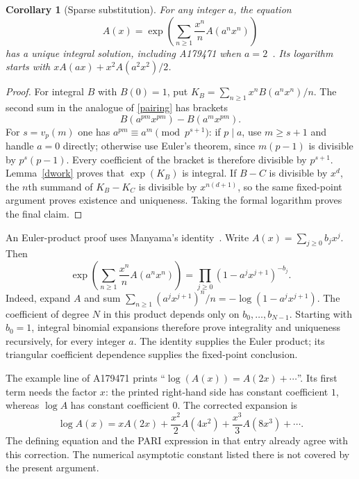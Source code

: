 \documentclass[11pt]{article}
\newtheorem{corollary}[theorem]{Corollary}
\begin{document}
\begin{corollary}[Sparse substitution]\label{sparse}
For any integer $a$, the equation
\begin{equation}\label{sparse-equation}
 A(x)=\exp\left(\sum_{n\geq1}\frac{x^n}{n}A(a^nx^n)\right)
\end{equation}
has a unique integral solution, including A179471 when $a=2$~\cite{oeis179471}.
Its logarithm starts with $xA(ax)+x^2A(a^2x^2)/2$.
\end{corollary}
\begin{proof}
For integral $B$ with $B(0)=1$, put $K_B=\sum_{n\geq1}x^nB(a^nx^n)/n$.
The second sum in the analogue of \eqref{pairing} has brackets
\[
 B(a^{pm}x^{pm})-B(a^m x^{pm}).
\]
For $s=v_p(m)$ one has $a^{pm}\equiv a^m\pmod{p^{s+1}}$:
if $p\mid a$, use $m\geq s+1$ and handle $a=0$ directly;
otherwise use Euler's theorem, since $m(p-1)$ is divisible by $p^s(p-1)$.
Every coefficient of the bracket is therefore divisible by $p^{s+1}$.
Lemma~\ref{dwork} proves that $\exp(K_B)$ is integral.
If $B-C$ is divisible by $x^d$, the $n$th summand of $K_B-K_C$
is divisible by $x^{n(d+1)}$, so the same fixed-point argument proves
existence and uniqueness. Taking the formal logarithm proves the final claim.
\end{proof}

An Euler-product proof uses Manyama's identity~\cite{manyama}.
Write $A(x)=\sum_{j\geq0}b_jx^j$. Then
\[
 \exp\left(\sum_{n\geq1}\frac{x^n}{n}A(a^nx^n)\right)
 =\prod_{j\geq0}(1-a^jx^{j+1})^{-b_j}.
\]
Indeed, expand $A$ and sum
$\sum_{n\geq1}(a^jx^{j+1})^n/n=-\log(1-a^jx^{j+1})$.
The coefficient of degree $N$ in this product depends only on
$b_0,\ldots,b_{N-1}$. Starting with $b_0=1$, integral binomial
expansions therefore prove integrality and uniqueness recursively,
for every integer $a$. The identity supplies the Euler product; its
triangular coefficient dependence supplies the fixed-point conclusion.

The example line of A179471 prints
``$\log(A(x))=A(2x)+\cdots$''. Its first term needs the factor $x$:
the printed right-hand side has constant coefficient $1$, whereas
$\log A$ has constant coefficient $0$. The corrected expansion is
\[
 \log A(x)=xA(2x)+\frac{x^2}{2}A(4x^2)+\frac{x^3}{3}A(8x^3)+\cdots.
\]
The defining equation and the PARI expression in that entry already agree
with this correction. The numerical asymptotic constant listed there is
not covered by the present argument.
\end{document}

